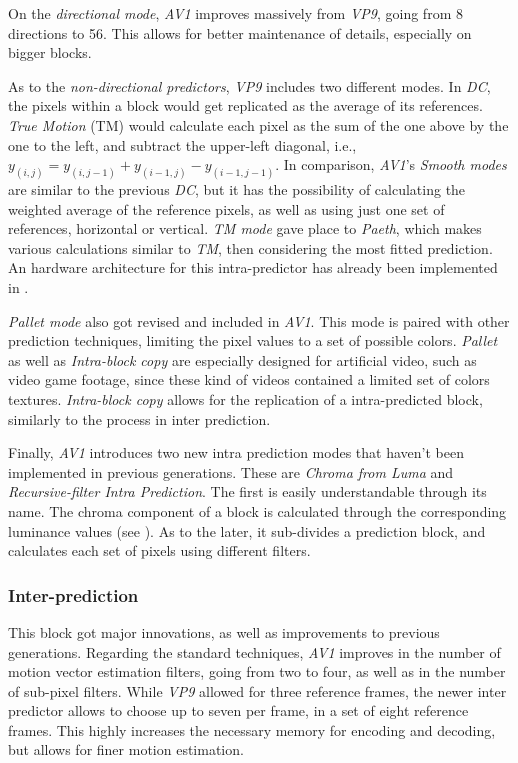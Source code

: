 On the \emph{directional mode}, \emph{AV1} improves massively from \emph{VP9}, going from 8 directions to 56. This allows for better maintenance of details, especially on bigger blocks. 

As to the \emph{non-directional predictors}, \emph{VP9} includes two different modes. In \emph{DC}, the pixels  within a block would get replicated as the average of its references. \emph{True Motion} (TM) would calculate each pixel as the sum of the one above by the one to the left, and subtract the upper-left diagonal, i.e., $y_{(i,j)}=y_{(i,j-1)}+y_{(i-1,j)}-y_{(i-1,j-1)}$. In comparison, \emph{AV1}'s \emph{Smooth modes} are similar to the previous \emph{DC}, but it has the possibility of calculating the weighted average of the reference pixels, as well as using just one set of references, horizontal or vertical. \emph{TM mode} gave place to \emph{Paeth}, which makes various calculations similar to \emph{TM}, then considering the most fitted prediction. An hardware architecture for this intra-predictor has already been implemented in \cite{correaHighThroughputHardware2019}.

\emph{Pallet mode} also got revised and included in \emph{AV1}. This mode is paired with other prediction techniques, limiting the pixel values to a set of possible colors. \emph{Pallet} as well as \emph{Intra-block copy} are especially designed for artificial video, such as video game footage, since these kind of videos contained a limited set of colors textures. \emph{Intra-block copy} allows for the replication of a intra-predicted block, similarly to the process in inter prediction.

Finally, \emph{AV1} introduces two new intra prediction modes that haven't been implemented in previous generations. These are \emph{Chroma from Luma} and \emph{Recursive-filter Intra Prediction}. The first is easily understandable through its name. The chroma component of a block is calculated through the corresponding luminance values (see \cite{trudeauPredictingChromaLuma2018}). As to the later, it sub-divides a prediction block, and calculates each set of pixels using different filters.

\subsubsection{Inter-prediction}

This block got major innovations, as well as improvements to previous generations. Regarding the standard techniques, \emph{AV1} improves in the number of motion vector estimation filters, going from two to four, as well as in the number of sub-pixel filters. While \emph{VP9} allowed for three reference frames, the newer inter predictor allows to choose up to seven per frame, in a set of eight reference frames. This highly increases the necessary memory for encoding and decoding, but allows for finer motion estimation.

